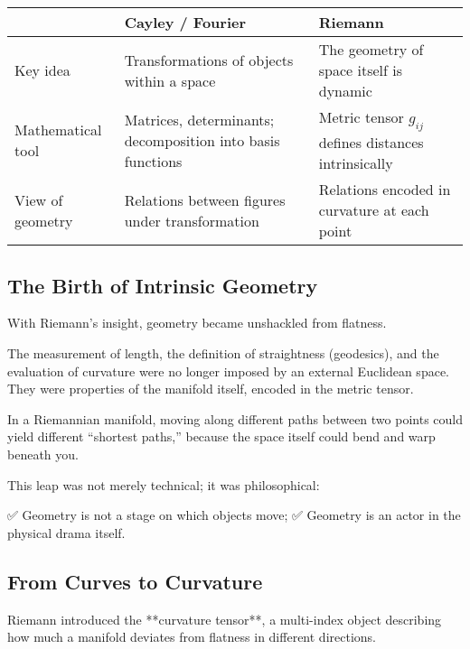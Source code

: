 \begin{tcolorbox}[colback=gray!5!white, colframe=black, title=\textbf{Sidebar: The Shift from Cayley and Fourier to Riemann}, fonttitle=\bfseries, arc=1.5mm, boxrule=0.4pt]

\begin{tabular}{>{\raggedright}p{4cm} >{\raggedright}p{5.5cm} >{\raggedright\arraybackslash}p{5.5cm}}
 & \textbf{Cayley / Fourier} & \textbf{Riemann} \\
\midrule
Key idea & Transformations of objects within a space & The geometry of space itself is dynamic \\
Mathematical tool & Matrices, determinants; decomposition into basis functions & Metric tensor \( g_{ij} \) defines distances intrinsically \\
View of geometry & Relations between figures under transformation & Relations encoded in curvature at each point
\end{tabular}

\end{tcolorbox}

\bigskip

\subsection*{The Birth of Intrinsic Geometry}

With Riemann’s insight, geometry became unshackled from flatness.

The measurement of length, the definition of straightness (geodesics), and the evaluation of curvature  
were no longer imposed by an external Euclidean space.  
They were properties of the manifold itself, encoded in the metric tensor.

In a Riemannian manifold, moving along different paths between two points could yield different “shortest paths,”  
because the space itself could bend and warp beneath you.

This leap was not merely technical; it was philosophical:

✅ Geometry is not a stage on which objects move;  
✅ Geometry is an actor in the physical drama itself.

\bigskip

\subsection*{From Curves to Curvature}

Riemann introduced the **curvature tensor**, a multi-index object describing how much a manifold deviates from flatness in different directions.

